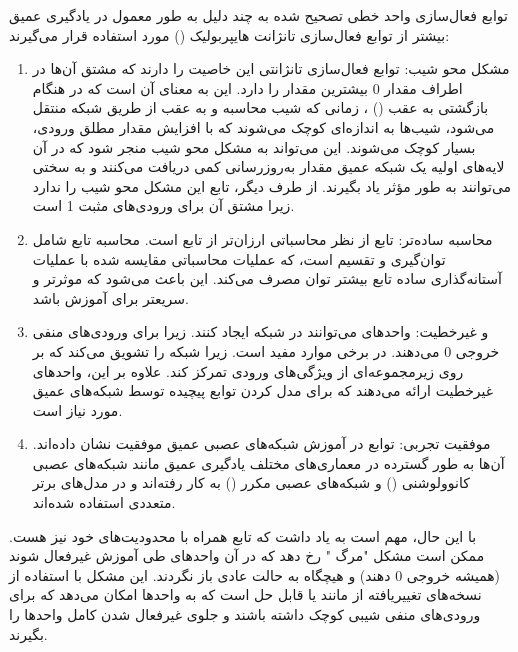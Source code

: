 \documentclass{article}
\begin{document}
توابع فعال‌سازی واحد خطی تصحیح شده  به چند دلیل به طور معمول در یادگیری عمیق بیشتر از توابع فعال‌سازی تانژانت هایپربولیک () مورد استفاده قرار می‌گیرند:
\begin{enumerate}
\item مشکل محو شیب: توابع فعال‌سازی تانژانتی این خاصیت را دارند که مشتق آن‌ها در اطراف مقدار 0 بیشترین مقدار را دارد. این به معنای آن است که در هنگام بازگشتی به عقب () ، زمانی که شیب محاسبه و به عقب از طریق شبکه منتقل می‌شود، شیب‌ها به اندازه‌ای کوچک می‌شوند که با افزایش مقدار مطلق ورودی، بسیار کوچک می‌شوند. این می‌تواند به مشکل محو شیب  منجر شود که در آن لایه‌های اولیه یک شبکه عمیق مقدار به‌روزرسانی کمی دریافت می‌کنند و به سختی می‌توانند به طور مؤثر یاد بگیرند. از طرف دیگر، تابع  این مشکل محو شیب را ندارد زیرا مشتق آن برای ورودی‌های مثبت 1 است.

\item محاسبه ساده‌تر: تابع  از نظر محاسباتی ارزان‌تر از تابع  است. محاسبه تابع  شامل توان‌گیری و تقسیم است، که عملیات محاسباتی مقایسه شده با عملیات آستانه‌گذاری ساده تابع  بیشتر توان مصرف می‌کند. این باعث می‌شود که  موثرتر و سریعتر برای آموزش باشد.

\item {} و غیرخطیت: واحدهای  می‌توانند  در شبکه ایجاد کنند. زیرا برای ورودی‌های منفی خروجی 0 می‌دهند.  در برخی موارد مفید است. زیرا شبکه را تشویق می‌کند که بر روی زیرمجموعه‌ای از ویژگی‌های ورودی تمرکز کند. علاوه بر این، واحدهای  غیرخطیت ارائه می‌دهند که برای مدل کردن توابع پیچیده توسط شبکه‌های عمیق مورد نیاز است.

\item موفقیت تجربی: توابع  در آموزش شبکه‌های عصبی عمیق موفقیت نشان داده‌اند. آن‌ها به طور گسترده در معماری‌های مختلف یادگیری عمیق مانند شبکه‌های عصبی کانوولوشنی () و شبکه‌های عصبی مکرر () به کار رفته‌اند و در مدل‌های برتر متعددی استفاده شده‌اند.
\end{enumerate}

با این حال، مهم است به یاد داشت که تابع  همراه با محدودیت‌های خود نیز هست. ممکن است مشکل "مرگ " رخ دهد که در آن واحدهای  طی آموزش غیرفعال شوند (همیشه خروجی 0 دهند) و هیچگاه به حالت عادی باز نگردند. این مشکل با استفاده از نسخه‌های تغییریافته از  مانند  یا  قابل حل است که به واحدها امکان می‌دهد که برای ورودی‌های منفی شیبی کوچک داشته باشند و جلوی غیرفعال شدن کامل واحدها را بگیرند.
\end{document}
